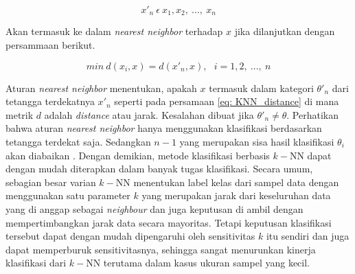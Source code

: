 \begin{equation}\label{eq: KNN_all_x_data}
x'_{n}\ \epsilon\ x_{1}, x_{2},\ ...,\ x_{n}
\end{equation}

\noindent Akan termasuk ke dalam \textit{nearest neighbor} terhadap $x$ jika dilanjutkan dengan persammaan berikut.

\begin{equation}\label{eq: KNN_distance}
min\ d(x_{i}, x) = d(x'_{n}, x),\ \ \ i = 1, 2,\ ...,\ n
\end{equation}

Aturan \textit{nearest neighbor} menentukan, apakah $x$ termasuk dalam kategori $\theta'_{n}$ dari tetangga terdekatnya $x'_{n}$ seperti pada persamaan \ref{eq: KNN_distance} di mana metrik $d$ adalah \textit{distance} atau jarak. Kesalahan dibuat jika $\theta'_{n} \neq \theta$. Perhatikan bahwa aturan \textit{nearest neighbor} hanya menggunakan klasifikasi berdasarkan tetangga terdekat saja. Sedangkan $n - 1$ yang merupakan sisa hasil klasifikasi $\theta_{i}$ akan diabaikan \citep{Cover1967}. Dengan demikian, metode klasifikasi berbasis $k-$NN dapat dengan mudah diterapkan dalam banyak tugas klasifikasi. Secara umum, sebagian besar varian $k-$NN menentukan label kelas dari sampel data dengan menggunakan satu parameter $k$ yang merupakan jarak dari keseluruhan data yang di anggap sebagai \textit{neighbour} dan juga keputusan di ambil dengan mempertimbangkan jarak data secara mayoritas. Tetapi keputusan klasifikasi tersebut dapat dengan mudah dipengaruhi oleh sensitivitas $k$ itu sendiri dan juga dapat memperburuk sensitivitasnya, sehingga sangat menurunkan kinerja klasifikasi dari $k-$NN terutama dalam kasus ukuran sampel yang kecil.

